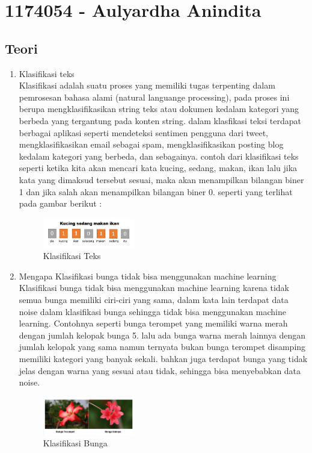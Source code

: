 \section{1174054 - Aulyardha Anindita}

\subsection{Teori}
\begin{enumerate}
\item Klasifikasi teks\\
Klasifikasi adalah suatu proses yang memiliki tugas terpenting dalam pemrosesan bahasa alami (natural languange processing), pada proses ini berupa mengklasifikasikan string teks atau dokumen kedalam kategori yang berbeda yang tergantung pada konten string. dalam klasfikasi teksi terdapat berbagai aplikasi seperti mendeteksi sentimen pengguna dari tweet, mengklasifikasikan email sebagai spam, mengklasifikasikan posting blog kedalam kategori yang berbeda, dan sebagainya. contoh dari klasifikasi teks seperti ketika kita akan mencari kata kucing, sedang, makan, ikan lalu jika kata yang dimaksud tersebut sesuai, maka akan menampilkan bilangan biner 1 dan jika salah akan menampilkan bilangan biner 0. seperti yang terlihat pada gambar berikut :
\hfill\break
	\begin{figure}[H]
		\includegraphics[width=4cm]{figures/1174054/4/1.png}
		\centering
		\caption{Klasifikasi Teks}
	\end{figure}

\item Mengapa Klasifikasi bunga tidak bisa menggunakan machine learning\\
Klasifikasi bunga tidak bisa menggunakan machine learning karena tidak semua bunga memiliki ciri-ciri yang sama, dalam kata lain terdapat data noise dalam klasifikasi bunga sehingga tidak bisa menggunakan machine learning. Contohnya seperti bunga terompet yang memiliki warna merah dengan jumlah kelopak bunga 5. lalu ada bunga warna merah lainnya dengan jumlah kelopak yang sama namun ternyata bukan bunga terompet disamping memiliki kategori yang banyak sekali. bahkan juga terdapat bunga yang tidak jelas dengan warna yang sesuai atau tidak, sehingga bisa menyebabkan data noise.
\hfill\break
	\begin{figure}[H]
		\includegraphics[width=4cm]{figures/1174054/4/2.png}
		\centering
		\caption{Klasifikasi Bunga}
	\end{figure}


\end{enumerate}
